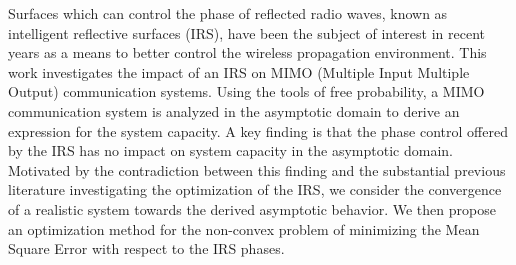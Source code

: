Surfaces which can control the phase of reflected radio waves, known as intelligent reflective surfaces (IRS), have been the subject of interest in recent years as a means to better control the wireless propagation environment. This work investigates the impact of an IRS on MIMO (Multiple Input Multiple Output)  communication systems. Using the tools of free probability, a MIMO communication system is analyzed in the asymptotic domain to derive an expression for the system capacity. A key finding is that the phase control offered by the IRS has no impact on system capacity in the asymptotic domain. Motivated by the contradiction between this finding and the substantial previous literature investigating the optimization of the IRS, we consider the convergence of a realistic system towards the derived asymptotic behavior. We then propose an optimization method for the non-convex problem of minimizing the Mean Square Error with respect to the IRS phases.